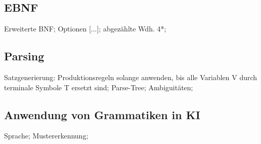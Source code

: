 \documentclass[german,color,6pt]{latex4ei/latex4ei_sheet}
\begin{document}
\begin{sectionbox}
\subsection{EBNF}
Erweiterte BNF; Optionen [...]; abgezählte Wdh. 4*; 
\end{sectionbox}

\begin{sectionbox}
\subsection{Parsing}
Satzgenerierung: Produktionsregeln solange anwenden, bis alle Variablen V durch terminale Symbole T ersetzt sind; Parse-Tree; Ambiguitäten; 
\end{sectionbox}

\begin{sectionbox}
\subsection{Anwendung von Grammatiken in KI}
Sprache; Mustererkennung; 
\end{sectionbox}
\end{document}
